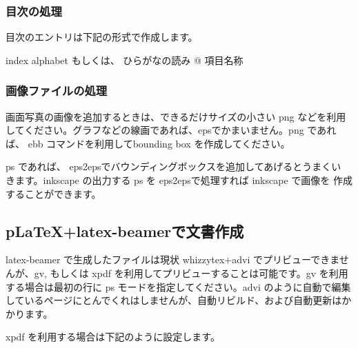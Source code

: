 \documentclass[mingoth,a4paper]{jsarticle}
\begin{document}
\begin{commandline}
 \label{sec:debmtg2007howtoprepare}
\end{commandline}

\subsubsection{目次の処理}

目次のエントリは下記の形式で作成します。
\begin{commandline}
index { alphabet もしくは、 ひらがなの読み @ 項目名称 } 
\end{commandline}

\subsubsection{画像ファイルの処理}

画面写真の画像を追加するときは、できるだけサイズの小さい png などを利用
してください。グラフなどの線画であれば、epsでかまいません。png であれば、 
ebb コマンドを利用してbounding box を作成してください。


ps であれば、 eps2epsでバウンディングボックスを追加してあげるとうまくい
きます。inkscape の出力する ps を eps2epsで処理すれば inkscape で画像を
作成することができます。

\subsection{pLaTeX+latex-beamerで文書作成}

latex-beamer で生成したファイルは現状 whizzytex+advi でプリビューできませ
んが、gv, もしくは xpdf を利用してプリビューすることは可能です。gv を利用
する場合は最初の行に ps モードを指定してください。advi のように自動で編集
しているページにとんでくれはしませんが、自動リビルド、および自動更新はか
かります。

\begin{commandline}
\end{commandline}

xpdf を利用する場合は下記のように設定します。

\begin{commandline}
\end{commandline}
\end{document}

